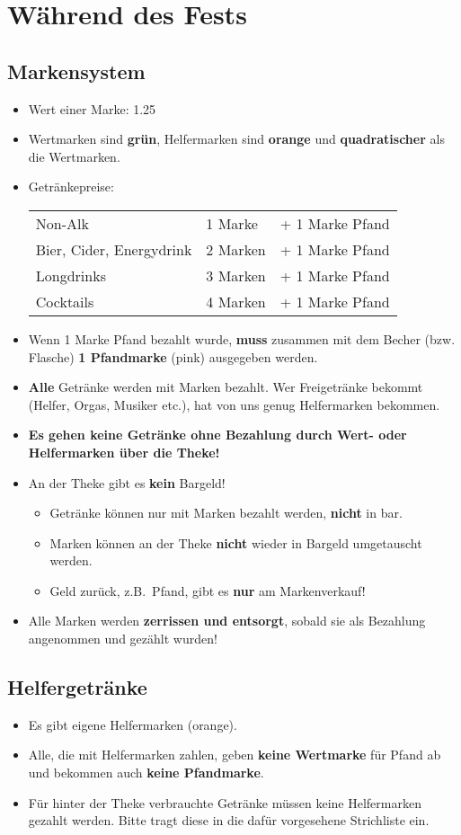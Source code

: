 \section{Während des Fests}
\subsection{Markensystem}
\begin{itemize}
  \item Wert einer Marke: {\large\SI{1.25}{\EUR}}
  \item Wertmarken sind \textbf{grün}, Helfermarken sind \textbf{orange} und \textbf{quadratischer} als die Wertmarken.
  \item Getränkepreise:

    \begin{tabular}{lll}
      Non-Alk & 1 Marke & + 1 Marke Pfand \\
      Bier, Cider, Energydrink & 2 Marken & + 1 Marke Pfand \\
      Longdrinks & 3 Marken & + 1 Marke Pfand \\
      Cocktails & 4 Marken & + 1 Marke Pfand
    \end{tabular}
  \item Wenn 1 Marke Pfand bezahlt wurde, \textbf{muss} zusammen mit dem Becher (bzw. Flasche) \textbf{1 Pfandmarke} (pink) ausgegeben werden.
  \item \textbf{Alle} Getränke werden mit Marken bezahlt. Wer Freigetränke bekommt (Helfer, Orgas, Musiker etc.), hat von uns genug Helfermarken bekommen.
  \item \textbf{Es gehen keine Getränke ohne Bezahlung durch Wert- oder Helfermarken über die Theke!}
  \item An der Theke gibt es \textbf{kein} Bargeld!
    \begin{itemize}
      \item Getränke können nur mit Marken bezahlt werden, \textbf{nicht} in bar.
      \item Marken können an der Theke \textbf{nicht} wieder in Bargeld umgetauscht werden.
      \item Geld zurück, z.B.\ Pfand, gibt es \textbf{nur} am Markenverkauf!
    \end{itemize}
  \item Alle Marken werden \textbf{zerrissen und entsorgt}, sobald sie als Bezahlung angenommen und gezählt wurden!
\end{itemize}
\subsection{Helfergetränke}
\begin{itemize}
  \item Es gibt eigene Helfermarken (orange).
  \item Alle, die mit Helfermarken zahlen, geben \textbf{keine Wertmarke} für Pfand ab und bekommen auch \textbf{keine Pfandmarke}.
  \item Für hinter der Theke verbrauchte Getränke müssen keine Helfermarken gezahlt werden. Bitte tragt diese in die dafür vorgesehene Strichliste ein.
\end{itemize}
